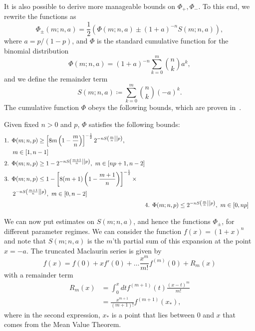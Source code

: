 \documentclass[pra,
aps,
twocolumn,
superscriptaddress,
groupedaddress,
nofootinbib,
reprint
]{revtex4-1}
\begin{document}
It is also possible to derive more manageable bounds on $\Phi_+, \Phi_-$.
To this end, we rewrite the functions as
\begin{equation}
	\Phi_{\pm}(m; n, a) = \frac{1}{2}(\Phi(m; n, a) \pm (1+a)^{-n} S(m; n, a)),
\end{equation}
where $a = p/(1-p)$, and $\Phi$ is the standard cumulative function for the binomial distribution
\begin{equation}
	\Phi(m; n, a) = (1+a)^{-n} \sum_{k=0}^m \binom{n}{k} a^k,
\end{equation}
and we define the remainder term
\begin{equation}
	S(m; n, a) \coloneqq \sum_{k=0}^m \binom{n}{k} (-a)^k.
\end{equation}
The cumulative function $\Phi$ obeys the following bounds, which are proven in~\cite{cit:ash}.
\begin{lemma}\label{lem:phi_bounds}
	Given fixed $n>0$ and $p$, $\Phi$ satisfies the following bounds:
	\begin{align*}
		\begin{split}
		&\text{1. } \Phi(m; n, p) \geq \left[ 8m\left(1-\frac{m}{n}\right) \right]^{-\frac{1}{2}} 2^{-n\ent{\frac{m}{n}}{p}}, \\
		&\hspace{14pt} m\in [1,n-1] \\
		&\text{2. } \Phi(m; n, p) \geq 1 - 2^{-n\ent{\frac{m+1}{n}}{p}},\ m\in [np+1,n-2] \\
		&\text{3. } \Phi(m; n, p) \leq 1 - \left[ 8(m+1)\left(1-\frac{m+1}{n}\right) \right]^{-\frac{1}{2}}\times \\
		&\hspace{14pt} 2^{-n\ent{\frac{m+1}{n}}{p}},\ m\in [0,n-2]
		\end{split}
		\\
		&\text{4. } \Phi(m; n, p) \leq 2^{-n\ent{\frac{m}{n}}{p}},\ m\in [0,np]
	\end{align*}
\end{lemma}

We can now put estimates on $S(m; n, a)$, and hence the functions $\Phi_{\pm}$, for different parameter regimes. 
We can consider the function $f(x) = (1+x)^n$ and note that $S(m; n, a)$ is the $m$'th partial sum of this expansion at the point $x=-a$. The truncated Maclaurin series is given by
\begin{equation}
	f(x) = f(0) + x f'(0) + \dots \frac{x^m}{m!}f^{(m)}(0) + R_m(x)
\end{equation}
with a remainder term
\begin{align}
	R_m (x)&= \int_{0}^x dt f^{(m+1)}(t) \frac{(x-t)^m}{m!} \\
	&= \frac{x^{m+1}}{(m+1)!} f^{(m+1)}(x_*),
\end{align}
where in the second expression, $x_*$ is a point that lies between $0$ and $x$ that comes from the Mean Value Theorem.
\end{document}
